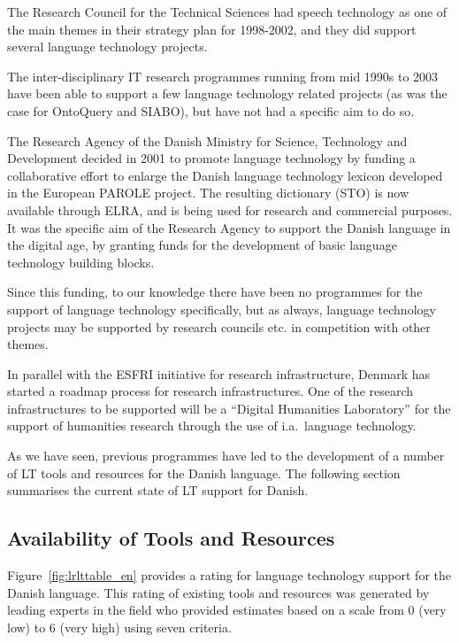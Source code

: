 \documentclass[]{../../metanetpaper}
\begin{document}
\begin{multicols}{2}
The Research Council for the Technical Sciences had speech technology as one of the main themes in their strategy plan for 1998-2002, and they did support several language technology projects.

The inter-disciplinary IT research programmes running from mid 1990s to 2003 have been able to support a few language technology related projects (as was the case for OntoQuery and SIABO), but have not had a specific aim to do so.

The Research Agency of the Danish Ministry for Science, Technology and Development decided in 2001 to promote language technology by funding a collaborative effort to enlarge the Danish language technology lexicon developed in the European PAROLE project. The resulting dictionary (STO) is now available through ELRA, and is being used for research and commercial purposes. It was the specific aim of the Research Agency to support the Danish language in the digital age, by granting funds for the development of basic language technology building blocks.

Since this funding, to our knowledge there have been no programmes for the support of language technology specifically, but as always, language technology projects may be supported by research councils etc. in competition with other themes.

In parallel with the ESFRI initiative for research infrastructure, Denmark has started a roadmap process for research infrastructures. One of the research infrastructures to be supported will be a “Digital Humanities Laboratory” for the support of humanities research through the use of i.a.\ language technology.


As we have seen, previous programmes have led to the development of a number of LT tools and resources for the Danish language. The following section summarises the current state of LT support for Danish.
  
\subsection{Availability of Tools and Resources}

Figure~\ref{fig:lrlttable_en} provides a rating for language technology support for the Danish language. This rating of existing tools and resources was generated by leading experts in the field who provided estimates based on a scale from 0 (very low) to 6 (very high) using seven criteria.


\end{multicols}
\end{document}
